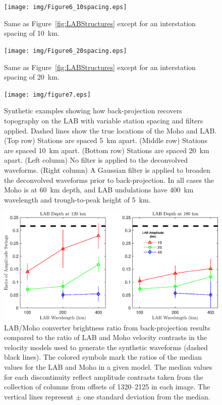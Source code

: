 \documentclass[referee]{gji}
\begin{document}
\begin{figure}
\centering
\texttt{[image: img/Figure6\_10spacing.eps]}
\caption{Same as Figure~\ref{fig:LABStructures} except for an interstation spacing of 10~km.}
\label{fig:LABStructures10km}
\end{figure}

\begin{figure}
\centering
\texttt{[image: img/Figure6\_20spacing.eps]}
\caption{Same as Figure~\ref{fig:LABStructures} except for an interstation spacing of 20~km.}
\label{fig:LABStructures20km}
\end{figure}

\begin{figure}
\centering
\texttt{[image: img/figure7.eps]}
\caption{Synthetic examples showing how back-projection recovers topography on the LAB with variable station spacing and filters applied.
Dashed lines show the true locations of the Moho and LAB.
(Top row) Stations are spaced 5~km apart.
(Middle row) Stations are spaced 10~km apart.
(Bottom row) Stations are spaced 20~km apart.
(Left column) No filter is applied to the deconvolved waveforms.
(Right column) A Gaussian filter is applied to broaden the deconvolved waveforms prior to back-projection.
In all cases the Moho is at 60~km depth, and LAB undulations have 400~km wavelength and trough-to-peak height of 5~km.}
\label{fig:StationSpacing}
\end{figure}

\begin{figure}
\centering
\includegraphics[scale=0.75]{img/FigureRecovery.eps}
\caption{LAB/Moho converter brightness ratio from back-projection results compared to the ratio of LAB and Moho velocity contrasts in the velocity models used to generate the synthetic waveforms (dashed black lines).  The colored symbols mark the ratios of the median values for the LAB and Moho in a given model. The median values for each discontinuity reflect amplitude contrasts taken from the collection of columns from offsets of 1320--2125 in each image.  The vertical lines represent $\pm$ one standard deviation from the median.}
\label{fig:FigureRecovery}
\end{figure}


\label{lastpage}
\end{document}
